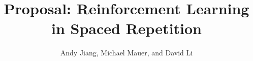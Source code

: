 \documentclass[12pt,notitlepage]{article}
\begin{document}
\title{Proposal: Reinforcement Learning in Spaced Repetition}
\author{Andy Jiang, Michael Mauer, and David Li}

\maketitle
\end{document}
